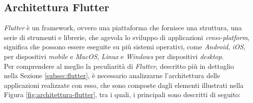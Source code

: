 \subsection{Architettura Flutter}
\label{subsec:architettura-flutter}

\emph{Flutter} è un \gls{framework}\glsoccur, ovvero una piattaforma che fornisce una struttura, una serie di strumenti e librerie, che agevola lo sviluppo di applicazioni \emph{cross-platform}, significa che possono essere eseguite su più sistemi operativi, come \emph{Android}, \emph{iOS}, per dispositivi \emph{mobile} e \emph{MacOS}, \emph{Linux} e \emph{Windows} per dispositivi \emph{desktop}.\\
Per comprendere al meglio la peculiarità di \emph{Flutter}, descritto più in dettaglio nella Sezione \ref{subsec:flutter}, è necessario analizzarne l'architettura \cite{site:flutter-architecture} delle applicazioni realizzate con esso, che sono composte dagli elementi illustrati nella Figura \ref{fig:architettura-flutter}, tra i quali, i principali sono descritti di seguito:

